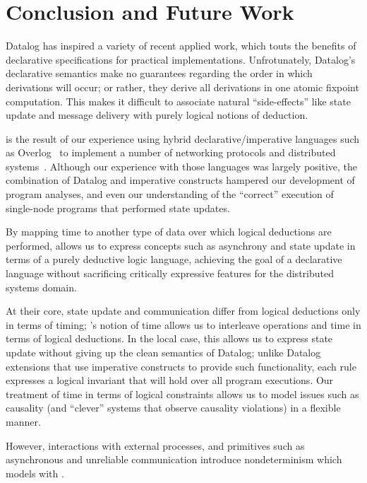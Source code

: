 \section{Conclusion and Future Work}
Datalog has inspired a variety of recent applied work, which touts the benefits of declarative specifications for practical implementations.  Unfrotunately, Datalog's declarative semantics make no guarantees
regarding the order in which derivations will occur; or rather, they derive all derivations in one atomic fixpoint computation.  This makes it difficult to associate natural ``side-effects'' like state update and message delivery with purely logical notions of deduction.


\lang is the result of our experience using hybrid declarative/imperative languages such as
Overlog~\cite{Loo2009-CACM} to implement a number of networking protocols
and distributed systems~\cite{boom-techr,Loo2009-CACM,Alvaro2009I-Do-Declare:-C,Chu:2007}.  Although our experience with those
languages was largely positive, the combination of Datalog and imperative constructs hampered our development of program analyses, and even our understanding of the ``correct'' execution of single-node programs that performed state updates.


By mapping time to another type of data over which logical deductions
are performed, \lang allows us to express concepts such as asynchrony and state update in terms of a purely deductive logic
language, achieving the goal of a declarative language without sacrificing critically expressive features for the distributed systems domain.

At their core, state update and communication differ from logical
deductions only in terms of timing; \lang's notion of time allows us
to interleave operations and time in terms of logical deductions.
In the local case, this allows us to express state update without giving up the clean semantics of Datalog; unlike
Datalog extensions that use imperative constructs to provide such
functionality, each \lang rule expresses a logical invariant that will
hold over all program executions.  
Our treatment of time in terms of
logical constraints allows us to model issues such as causality (and
``clever'' systems that observe causality violations) in a flexible
manner.

However, interactions with external processes, and primitives such as
asynchronous and unreliable communication introduce nondeterminism
which \lang models with .  

